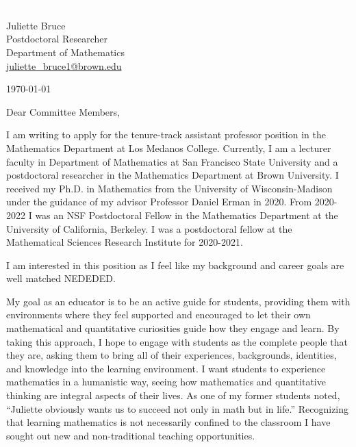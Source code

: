 \documentclass[11pt]{article}
\begin{document}
\section*{}

\noindent
\begin{minipage}{0.99\textwidth}
\begin{minipage}{0.69\textwidth}
\textcolor{white}{.}
\end{minipage}
\begin{minipage}{0.29\textwidth}
{
Juliette Bruce \\
Postdoctoral Researcher \\
Department of Mathematics \\
\href{mailto:juliette\_bruce1@brown.edu}{juliette\_bruce1@brown.edu}
}

\vspace{12pt}
\today
\end{minipage}
\end{minipage}


\vspace{12pt}
\noindent
Dear Committee Members,

I am writing to apply for the tenure-track assistant professor position in the Mathematics Department at Los Medanos College. Currently, I am a lecturer faculty in Department of Mathematics at San Francisco State University and a postdoctoral researcher in the Mathematics Department at Brown University. I received my Ph.D. in Mathematics from the University of Wisconsin-Madison under the guidance of my advisor Professor Daniel Erman in 2020. From 2020-2022 I was an NSF Postdoctoral Fellow in the Mathematics Department at the University of California, Berkeley. I was a postdoctoral fellow at the Mathematical Sciences Research Institute for 2020-2021.

I am interested in this position as I feel like my background and career goals are well matched NEDEDED. 

My goal as an educator is to be an active guide for students, providing them with environments where they feel supported and encouraged to let their own mathematical and quantitative curiosities guide how they engage and learn. By taking this approach, I hope to engage with students as the complete people that they are, asking them to bring all of their experiences, backgrounds, identities, and knowledge into the learning environment. I want students to experience mathematics in a humanistic way, seeing how mathematics and quantitative thinking are integral aspects of their lives.  As one of my former students noted, ``Juliette obviously wants us to succeed not only in math but in life.'' Recognizing that learning mathematics is not necessarily confined to the classroom I have sought out new and non-traditional teaching opportunities. 
\end{document}
